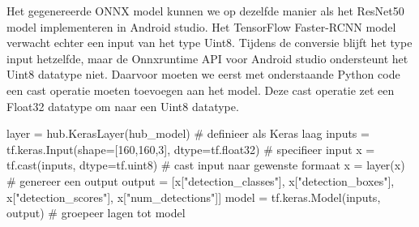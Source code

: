 Het gegenereerde ONNX model kunnen we op dezelfde manier als het ResNet50 model implementeren in Android studio.
Het TensorFlow Faster-RCNN model verwacht echter een input van het type Uint8.
Tijdens de conversie blijft het type input hetzelfde, maar de Onnxruntime API voor Android studio ondersteunt het Uint8 datatype niet.
Daarvoor moeten we eerst met onderstaande Python code een cast operatie moeten toevoegen aan het model.
Deze cast operatie zet een Float32 datatype om naar een Uint8 datatype.

\begin{python}
layer = hub.KerasLayer(hub_model) # definieer als Keras laag
inputs = tf.keras.Input(shape=[160,160,3], dtype=tf.float32) # specifieer input
x = tf.cast(inputs, dtype=tf.uint8) # cast input naar gewenste formaat
x = layer(x) # genereer een output
output = [x["detection_classes"], x["detection_boxes"], x["detection_scores"], x["num_detections"]]
model = tf.keras.Model(inputs, output) # groepeer lagen tot model
\end{python}

